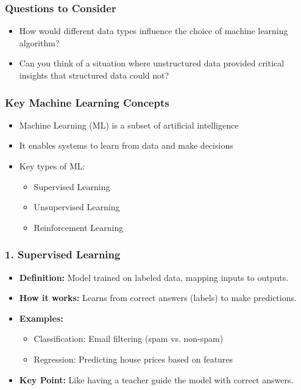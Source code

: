 \documentclass[aspectratio=169]{beamer}
\begin{document}
\begin{frame}[fragile]
    \frametitle{Questions to Consider}
    \begin{itemize}
        \item How would different data types influence the choice of machine learning algorithm?
        \item Can you think of a situation where unstructured data provided critical insights that structured data could not?
    \end{itemize}
\end{frame}

\begin{frame}[fragile]
    \frametitle{Key Machine Learning Concepts}
    \begin{itemize}
        \item Machine Learning (ML) is a subset of artificial intelligence
        \item It enables systems to learn from data and make decisions
        \item Key types of ML:
        \begin{itemize}
            \item Supervised Learning
            \item Unsupervised Learning
            \item Reinforcement Learning
        \end{itemize}
    \end{itemize}
\end{frame}

\begin{frame}[fragile]
    \frametitle{1. Supervised Learning}
    \begin{itemize}
        \item \textbf{Definition:} Model trained on labeled data, mapping inputs to outputs.
        \item \textbf{How it works:} Learns from correct answers (labels) to make predictions.
        \item \textbf{Examples:}
        \begin{itemize}
            \item Classification: Email filtering (spam vs. non-spam)
            \item Regression: Predicting house prices based on features
        \end{itemize}
        \item \textbf{Key Point:} Like having a teacher guide the model with correct answers.
    \end{itemize}
\end{frame}
\end{document}
